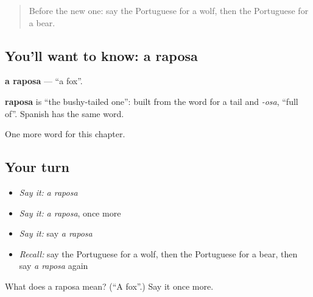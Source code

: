 \begin{quote}
Before the new one: say the Portuguese for a wolf, then the Portuguese for a bear.
\end{quote}

\subsection*{You'll want to know: a raposa}
\textbf{a raposa} — \textquotedblleft{}a fox\textquotedblright{}.

\begin{cousinweb}
\textbf{raposa} is \textquotedblleft{}the bushy-tailed one\textquotedblright{}: built from the word for a tail and \emph{-osa}, \textquotedblleft{}full of\textquotedblright{}. Spanish has the same word.
\end{cousinweb}

\begin{grammarlens}[title={What you've built}]
One more word for this chapter.
\end{grammarlens}

\subsection*{Your turn}
\begin{itemize}
\raggedright
  \item \emph{Say it:} \emph{a raposa}
  \item \emph{Say it:} \emph{a raposa}, once more
  \item \emph{Say it:} say \emph{a raposa}
  \item \emph{Recall:} say the Portuguese for a wolf, then the Portuguese for a bear, then say \emph{a raposa} again
\end{itemize}

\begin{tcolorbox}[breakable,colback=teal!4,colframe=teal!35!black,title={Before you move on}]
What does a raposa mean? (\textquotedblleft{}A fox\textquotedblright{}.) Say it once more.
\end{tcolorbox}
